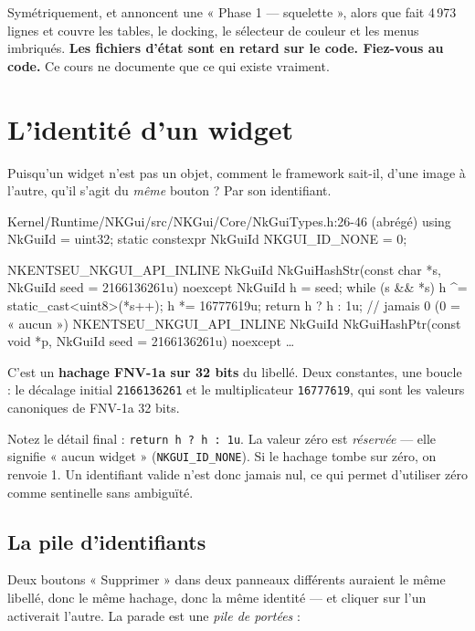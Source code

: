 Symétriquement,  et  annoncent
une « Phase 1 — squelette », alors que  fait
4\,973 lignes et couvre les tables, le docking, le sélecteur de couleur et les
menus imbriqués. \textbf{Les fichiers d'état sont en retard sur le code. Fiez-vous
au code.} Ce cours ne documente que ce qui existe vraiment.

\section{L'identité d'un widget}

Puisqu'un widget n'est pas un objet, comment le framework sait-il, d'une image à
l'autre, qu'il s'agit du \emph{même} bouton ? Par son identifiant.

\begin{nkcode}{Kernel/Runtime/NKGui/src/NKGui/Core/NkGuiTypes.h:26-46 (abrégé)}
using NkGuiId = uint32;
static constexpr NkGuiId NKGUI_ID_NONE = 0;

NKENTSEU_NKGUI_API_INLINE NkGuiId NkGuiHashStr(const char *s, NkGuiId seed = 2166136261u) noexcept {
    NkGuiId h = seed;
    while (s && *s) { h ^= static_cast<uint8>(*s++); h *= 16777619u; }
    return h ? h : 1u;                                  // jamais 0 (0 = « aucun »)
}
NKENTSEU_NKGUI_API_INLINE NkGuiId NkGuiHashPtr(const void *p, NkGuiId seed = 2166136261u) noexcept { … }
\end{nkcode}

C'est un \textbf{hachage FNV-1a sur 32 bits} du libellé. Deux constantes, une
boucle : le décalage initial \texttt{2166136261} et le multiplicateur
\texttt{16777619}, qui sont les valeurs canoniques de FNV-1a 32 bits.

Notez le détail final : \texttt{return h ? h : 1u}. La valeur zéro est
\emph{réservée} — elle signifie « aucun widget » (\texttt{NKGUI\_ID\_NONE}). Si
le hachage tombe sur zéro, on renvoie 1. Un identifiant valide n'est donc jamais
nul, ce qui permet d'utiliser zéro comme sentinelle sans ambiguïté.

\subsection{La pile d'identifiants}

Deux boutons « Supprimer » dans deux panneaux différents auraient le même
libellé, donc le même hachage, donc la même identité — et cliquer sur l'un
activerait l'autre. La parade est une \emph{pile de portées} :

